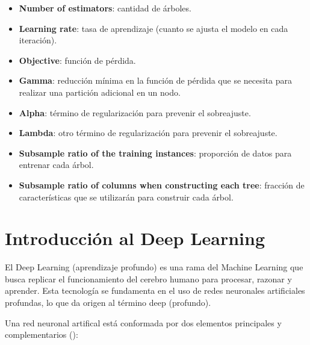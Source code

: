 \documentclass[12pt,a4paper]{report}
\begin{document}
\begin{itemize}
    \item \textbf{Number of estimators}: cantidad de árboles.

    \item \textbf{Learning rate}: tasa de aprendizaje (cuanto se ajusta el modelo en cada iteración).

    \item \textbf{Objective}: función de pérdida.

    \item \textbf{Gamma}: reducción mínima en la función de pérdida que se necesita para realizar una partición adicional en un nodo.

    \item \textbf{Alpha}: término de regularización para prevenir el sobreajuste.

    \item \textbf{Lambda}: otro término de regularización para prevenir el sobreajuste.
    
    \item \textbf{Subsample ratio of the training instances}: proporción de datos para entrenar cada árbol.

    \item \textbf{Subsample ratio of columns when constructing each tree}: fracción de características que se utilizarán para construir cada árbol. 
\end{itemize}

\section{Introducción al Deep Learning}

El Deep Learning (aprendizaje profundo) es una rama del Machine Learning que busca replicar el funcionamiento del cerebro humano para procesar, razonar y aprender. Esta tecnología se fundamenta en el uso de redes neuronales artificiales profundas, lo que da origen al término deep (profundo).

Una red neuronal artifical está conformada por dos elementos principales y complementarios (\cite{gonzalezdorado2024DP}):
\end{document}

